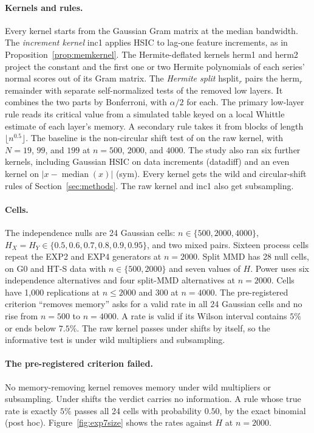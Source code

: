 \documentclass[11pt]{article}
\theoremstyle{remark}
\begin{document}
\paragraph{Kernels and rules.} Every kernel starts from the Gaussian Gram matrix at the median bandwidth. The \emph{increment kernel} inc1 applies HSIC to lag-one feature increments, as in Proposition~\ref{prop:memkernel}. The Hermite-deflated kernels herm1 and herm2 project the constant and the first one or two Hermite polynomials of each series' normal scores out of its Gram matrix. The \emph{Hermite split} hsplit$_r$ pairs the herm$_r$ remainder with separate self-normalized tests of the removed low layers. It combines the two parts by Bonferroni, with $\alpha/2$ for each. The primary low-layer rule reads its critical value from a simulated table keyed on a local Whittle estimate of each layer's memory. A secondary rule takes it from blocks of length $\lfloor n^{0.5}\rfloor$. The baseline is the non-circular shift test of \citet{harris2020shift} on the raw kernel, with $N=19$, $99$, and $199$ at $n=500$, $2000$, and $4000$. The study also ran six further kernels, including Gaussian HSIC on data increments (datadiff) and an even kernel on $|x-\operatorname{median}(x)|$ (sym). Every kernel gets the wild and circular-shift rules of Section~\ref{sec:methods}. The raw kernel and inc1 also get subsampling.

\paragraph{Cells.} The independence nulls are 24 Gaussian cells: $n\in\{500,2000,4000\}$, $H_X=H_Y\in\{0.5,0.6,0.7,0.8,0.9,0.95\}$, and two mixed pairs. Sixteen process cells repeat the EXP2 and EXP4 generators at $n=2000$. Split MMD has 28 null cells, on G0 and HT-S data with $n\in\{500,2000\}$ and seven values of $H$. Power uses six independence alternatives and four split-MMD alternatives at $n=2000$. Cells have 1,000 replications at $n\le2000$ and 300 at $n=4000$. The pre-registered criterion ``removes memory'' asks for a valid rate in all 24 Gaussian cells and no rise from $n=500$ to $n=4000$. A rate is valid if its Wilson interval contains $5\%$ or ends below $7.5\%$. The raw kernel passes under shifts by itself, so the informative test is under wild multipliers and subsampling.

\paragraph{The pre-registered criterion failed.} No memory-removing kernel removes memory under wild multipliers or subsampling. Under shifts the verdict carries no information. A rule whose true rate is exactly $5\%$ passes all 24 cells with probability $0.50$, by the exact binomial (post hoc). Figure~\ref{fig:exp7size} shows the rates against $H$ at $n=2000$.
\end{document}
